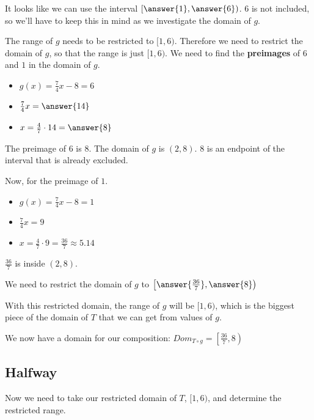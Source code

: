 \documentclass{ximera}
\begin{document}
\begin{explanation}



It looks like we can use the interval $\left[ \answer{1}, \answer{6} \right)$.   $6$ is not included, so we'll have to keep this in mind as we investigate the domain of $g$.


The range of $g$ needs to be restricted to $[1, 6)$.  Therefore we need to restrict the domain of $g$, so that the range is just $[1, 6)$. We need to find the \textbf{preimages} of $6$ and $1$ in the domain of $g$.




\begin{itemize}
\item $g(x) = \frac{7}{4}x-8 = 6$
\item $\frac{7}{4}x = \answer{14}$
\item $x = \frac{4}{7} \cdot 14 = \answer{8}$
\end{itemize}


The preimage of $6$ is $8$.  The domain of $g$ is $(2,8)$. $8$ is an endpoint of the interval that is already excluded.


Now, for the preimage of $1$.

\begin{itemize}
\item $g(x) = \frac{7}{4}x-8 = 1$
\item $\frac{7}{4}x = 9$
\item $x = \frac{4}{7} \cdot 9 = \frac{36}{7} \approx 5.14$
\end{itemize}

$\frac{36}{7}$ is inside $(2,8)$.

We need to restrict the domain of $g$ to $\left[ \answer{\frac{36}{7}}, \answer{8} \right)$


With this restricted domain, the range of $g$ will be $[1, 6)$, which is the biggest piece of the domain of $T$ that we can get from values of $g$.

We now have a domain for our composition: $Dom_{T \circ g} = \left[\frac{36}{7}, 8\right)$

\end{explanation}

\subsection{Halfway}



Now we need to take our restricted domain of $T$, $[1, 6)$, and determine the restricted range.
\end{document}
